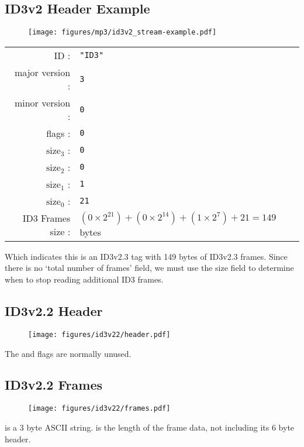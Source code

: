 \clearpage

\subsection{ID3v2 Header Example}
\begin{figure}[h]
  \texttt{[image: figures/mp3/id3v2\_stream-example.pdf]}
\end{figure}
\begin{table}[h]
  \begin{tabular}{rl}
    ID : & \texttt{"ID3"} \\
    major version : & \texttt{3} \\
    minor version : & \texttt{0} \\
    flags : & \texttt{0} \\
    $\text{size}_3$ : & \texttt{0} \\
    $\text{size}_2$ : & \texttt{0} \\
    $\text{size}_1$ : & \texttt{1} \\
    $\text{size}_0$ : & \texttt{21} \\
    ID3 Frames size : & $(0 \times 2 ^ {21}) + (0 \times 2 ^ {14}) + (1 \times 2 ^ 7) + 21 = 149$ bytes \\
  \end{tabular}
\end{table}
\par
\noindent
Which indicates this is an ID3v2.3 tag with 149 bytes of ID3v2.3 frames.
Since there is no `total number of frames' field,
we must use the size field to determine when to stop reading
additional ID3 frames.

\clearpage

\subsection{ID3v2.2 Header}

\begin{figure}[h]
\texttt{[image: figures/id3v22/header.pdf]}
\end{figure}
\par
\noindent
The  and  flags are normally unused.

\subsection{ID3v2.2 Frames}
\begin{figure}[h]
\texttt{[image: figures/id3v22/frames.pdf]}
\end{figure}
\par
\noindent
{} is a 3 byte ASCII string.
 is the length of the frame data,
not including its 6 byte header.

